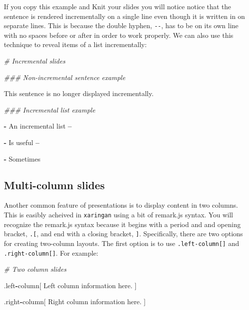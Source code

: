 \documentclass[
]{book}
\newenvironment{Shaded}{\begin{snugshade}}{\end{snugshade}}
\newcommand{\CommentTok}[1]{\textcolor[rgb]{0.37,0.37,0.37}{\textit{#1}}}
\newcommand{\NormalTok}[1]{#1}
\newcommand{\OperatorTok}[1]{\textcolor[rgb]{0.43,0.43,0.43}{\textbf{#1}}}
\newcommand{\StringTok}[1]{\textcolor[rgb]{0.5,0.5,0.5}{#1}}
\begin{document}
If you copy this example and Knit your slides you will notice notice that the sentence is rendered incrementally on a single line even though it is written in on separate lines. This is because the double hyphen, \texttt{-\/-}, has to be on its own line with no spaces before or after in order to work properly. We can also use this technique to reveal items of a list incrementally:

\begin{Shaded}
\begin{Highlighting}[]
\CommentTok{# Incremental slides}

\CommentTok{### Non-incremental sentence example}

\NormalTok{This sentence is no longer displayed incrementally. }

\CommentTok{### Incremental list example}

\OperatorTok{-}\StringTok{ }\NormalTok{An incremental list}
\OperatorTok{--}

\OperatorTok{-}\StringTok{ }\NormalTok{Is useful}
\OperatorTok{--}

\OperatorTok{-}\StringTok{ }\NormalTok{Sometimes}
\end{Highlighting}
\end{Shaded}

\hypertarget{multi-column-slides}{%
\subsection{Multi-column slides}\label{multi-column-slides}}

Another common feature of presentations is to display content in two columns. This is easibly acheived in \texttt{xaringan} using a bit of remark.js syntax. You will recognize the remark.js syntax because it begins with a period and and opening bracket, \texttt{.{[}}, and end with a closing bracket, \texttt{{]}}. Specifically, there are two options for creating two-column layouts. The first option is to use \texttt{.left-column{[}{]}} and \texttt{.right-column{[}{]}}. For example:

\begin{Shaded}
\begin{Highlighting}[]
\CommentTok{# Two column slides}

\NormalTok{.left}\OperatorTok{-}\NormalTok{column[}
\NormalTok{Left column information here.}
\NormalTok{]}

\NormalTok{.right}\OperatorTok{-}\NormalTok{column[}
\NormalTok{Right column information here.}
\NormalTok{]}
\end{Highlighting}
\end{Shaded}
\end{document}
